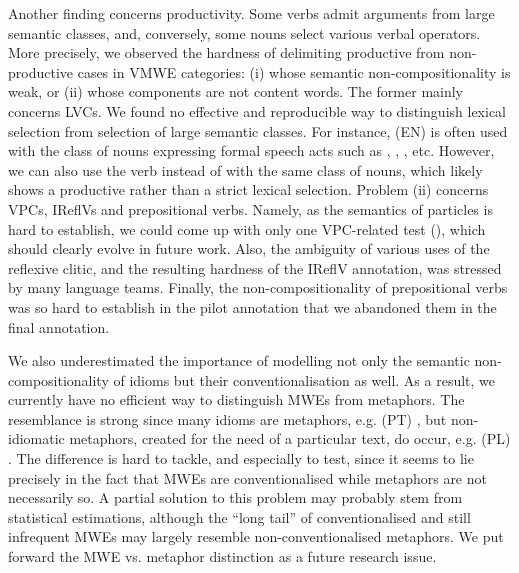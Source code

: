 \documentclass[output=paper,
modfonts,
]{langscibook}
\begin{document}
Another finding concerns productivity. Some verbs admit arguments from large semantic classes, and, conversely, some nouns select various verbal operators. More precisely, we observed 
the hardness of delimiting productive from non-productive cases in VMWE categories: (i) whose semantic non-com\-po\-si\-tio\-na\-li\-ty is weak, or (ii) whose components are not content words. The former mainly concerns LVCs. We found no effective and reproducible way to distinguish lexical selection from selection of large semantic classes. For instance, (EN)  is often used with the class of nouns expressing formal speech acts such as , , , etc. However, we can also use the verb  instead of  with the same class of nouns, which likely shows a productive rather than a strict lexical selection. Problem (ii) concerns VPCs, IReflVs and prepositional verbs. Namely, as the semantics of particles is hard to establish, we could come up with only one VPC-related test (), which should clearly evolve in future work. Also, the ambiguity of various uses of the reflexive clitic, and the resulting hardness of the IReflV annotation, was stressed by many language teams. Finally, the non-compositionality of prepositional verbs was so hard to establish in the pilot annotation that we abandoned them in the final annotation.

We also underestimated the importance of modelling not only the semantic non-compositionality of idioms but their conventionalisation as well. As a result, we currently have no efficient way to distinguish MWEs from metaphors. The resemblance is strong since many idioms are metaphors, e.g. (PT) , but non-idiomatic metaphors, created for the need of a particular text, do occur, e.g. (PL) . The difference is hard to tackle, and especially to test, since it seems to lie precisely in the fact that MWEs are conventionalised while metaphors are not necessarily so. A partial solution to this problem may probably stem from statistical estimations, although the ``long tail'' of conventionalised and still infrequent MWEs may largely resemble non-conventionalised metaphors. We put forward the MWE vs. metaphor distinction as a future research issue.

\end{document}
